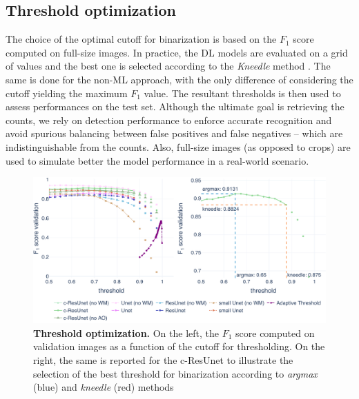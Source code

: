 \subsection{Threshold optimization}

The choice of the optimal cutoff for binarization is based on the $F_1$ score computed on full-size images. In practice, the DL models are evaluated on a grid of values and the best one is selected according to the \textit{Kneedle} method \cite{kneedle}. 
The same is done for the non-ML approach, with the only difference of considering the cutoff yielding the maximum $F_1$ value. 
The resultant thresholds is then used to assess performances on the test set.
Although the ultimate goal is retrieving the counts, we rely on detection performance to enforce accurate recognition and avoid spurious balancing between false positives and false negatives -- which are indistinguishable from the counts.
Also, full-size images (as opposed to crops) are used to simulate better the model performance in a real-world scenario.
\begin{figure}
\centerline{
\includegraphics[width=\textwidth]{figures/130_methods/F1_optimization.pdf}
}
\caption{\textbf{Threshold optimization.} On the left, the $F_{1}$ score computed on validation images as a function of the cutoff for thresholding.
On the right, the same is reported for the c-ResUnet to illustrate the selection of the best threshold for binarization according to \textit{argmax} (blue) and \textit{kneedle} (red) methods
} 
\label{fig:thresh_opt}
\end{figure}

